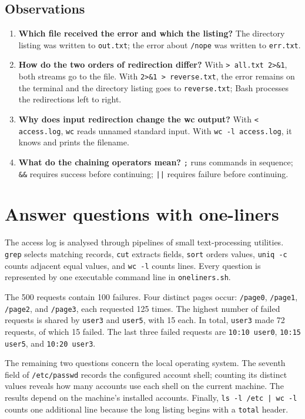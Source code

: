 \documentclass{tum_report}
\begin{document}
\subsection{Observations}
\begin{enumerate}
    \item \textbf{Which file received the error and which the listing?}
    The directory listing was written to \texttt{out.txt}; the error about
    \texttt{/nope} was written to \texttt{err.txt}.
    \item \textbf{How do the two orders of redirection differ?}
    With \texttt{> all.txt 2>\&1}, both streams go to the file. With
    \texttt{2>\&1 > reverse.txt}, the error remains on the terminal and the
    directory listing goes to \texttt{reverse.txt}; Bash processes the
    redirections left to right.
    \item \textbf{Why does input redirection change the wc output?}
    With \texttt{< access.log}, \texttt{wc} reads unnamed standard input.
    With \texttt{wc -l access.log}, it knows and prints the filename.
    \item \textbf{What do the chaining operators mean?}
    \texttt{;} runs commands in sequence; \texttt{\&\&} requires success
    before continuing; \texttt{||} requires failure before continuing.
\end{enumerate}

\section{Answer questions with one-liners}

The access log is analysed through pipelines of small text-processing
utilities. \texttt{grep} selects matching records, \texttt{cut} extracts
fields, \texttt{sort} orders values, \texttt{uniq -c} counts adjacent equal
values, and \texttt{wc -l} counts lines. Every question is represented by
one executable command line in \texttt{oneliners.sh}.

The 500 requests contain 100 failures. Four distinct pages occur:
\texttt{/page0}, \texttt{/page1}, \texttt{/page2}, and \texttt{/page3},
each requested 125 times. The highest number of failed requests is shared
by \texttt{user3} and \texttt{user5}, with 15 each. In total,
\texttt{user3} made 72 requests, of which 15 failed. The last three failed
requests are \texttt{10:10 user0}, \texttt{10:15 user5}, and
\texttt{10:20 user3}.

The remaining two questions concern the local operating system.
The seventh field of \texttt{/etc/passwd} records the configured account
shell; counting its distinct values reveals how many accounts use each
shell on the current machine. The results depend on the machine's installed
accounts. Finally, \texttt{ls -l /etc | wc -l} counts one additional line
because the long listing begins with a \texttt{total} header.
\end{document}
